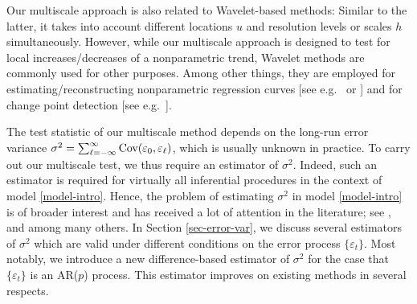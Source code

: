 Our multiscale approach is also related to Wavelet-based methods: Similar to the latter, it takes into account different locations $u$ and resolution levels or scales $h$ simultaneously. However, while our multiscale approach is designed to test for local increases/decreases of a nonparametric trend, Wavelet methods are commonly used for other purposes. Among other things, they are employed for estimating/reconstructing nonparametric regression curves [see e.g.\ \cite{Donoho1995} or \cite{vonSachsMacGibbon2000}] and for change point detection [see e.g.\ \citet{ChoFryzlewicz2012}]. 




The test statistic of our multiscale method depends on the long-run error variance $\sigma^2 = \sum\nolimits_{\ell=-\infty}^{\infty} \textnormal{Cov}(\varepsilon_0,\varepsilon_{\ell})$, which is usually unknown in practice. To carry out our multiscale test, we thus require an estimator of $\sigma^2$. Indeed, such an estimator is required for virtually all inferential procedures in the context of model \eqref{model-intro}. Hence, the problem of estimating $\sigma^2$ in model \eqref{model-intro} is of broader interest and has received a lot of attention in the literature; see \cite{MuellerStadtmueller1988}, \cite{Herrmann1992} and \cite{Hall2003} among many others. In Section \ref{sec-error-var}, we discuss several estimators of $\sigma^2$ which are valid under different conditions on the error process $\{\varepsilon_t\}$. Most notably, we introduce a new difference-based estimator of $\sigma^2$ for the case that $\{ \varepsilon_t \}$ is an AR($p$) process. This estimator improves on existing methods in several respects. 


